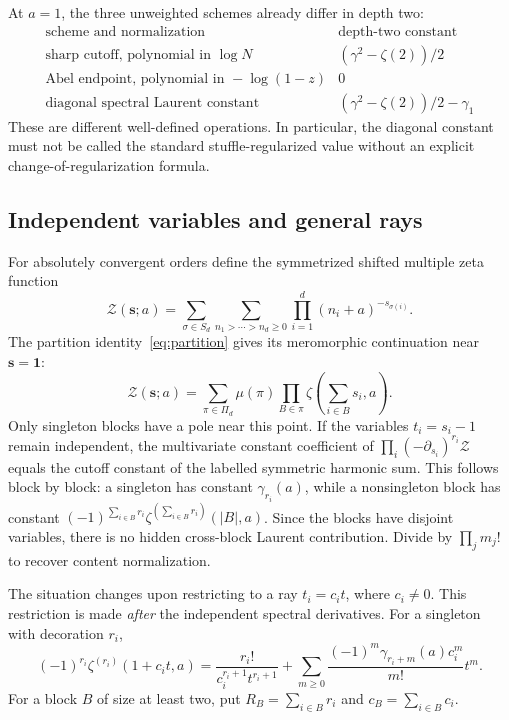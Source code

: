 \documentclass[11pt,oneside]{article}
\numberwithin{equation}{section}
\theoremstyle{definition}
\theoremstyle{remark}
\begin{document}
At $a=1$, the three unweighted schemes already differ in depth two:
\begin{equation}\label{eq:three-schemes}
\begin{array}{c|c}
\text{scheme and normalization}&\text{depth-two constant}\\ \hline
\text{sharp cutoff, polynomial in }\log N
  &(\gamma^2-\zeta(2))/2\\[2pt]
\text{Abel endpoint, polynomial in }-\log(1-z)&0\\[2pt]
\text{diagonal spectral Laurent constant}
  &(\gamma^2-\zeta(2))/2-\gamma_1
\end{array}
\end{equation}
These are different well-defined operations. In particular, the diagonal
constant must not be called the standard stuffle-regularized value without
an explicit change-of-regularization formula.

\subsection{Independent variables and general rays}

For absolutely convergent orders define the symmetrized shifted multiple
zeta function
\[
\mathscr Z(\mathbf s;a)=\sum_{\sigma\in S_d}
 \sum_{n_1>\cdots>n_d\ge0}
 \prod_{i=1}^d(n_i+a)^{-s_{\sigma(i)}}.
\]
The partition identity~\eqref{eq:partition} gives its meromorphic continuation
near $\mathbf s=\mathbf1$:
\begin{equation}\label{eq:symmetric-zeta}
\mathscr Z(\mathbf s;a)=\sum_{\pi\in\Pi_d}\mu(\pi)
                         \prod_{B\in\pi}\zeta\!\left(\sum_{i\in B}s_i,a\right).
\end{equation}
Only singleton blocks have a pole near this point. If the variables
$t_i=s_i-1$ remain independent, the multivariate constant coefficient of
$\prod_i(-\partial_{s_i})^{r_i}\mathscr Z$ equals the cutoff constant of the
labelled symmetric harmonic sum. This follows block by block: a singleton
has constant $\gamma_{r_i}(a)$, while a nonsingleton block has constant
$(-1)^{\sum_{i\in B}r_i}\zeta^{(\sum_{i\in B}r_i)}(|B|,a)$.
Since the blocks have disjoint variables, there is no hidden cross-block
Laurent contribution. Divide by $\prod_jm_j!$ to recover content normalization.

The situation changes upon restricting to a ray $t_i=c_it$, where $c_i\ne0$.
This restriction is made \emph{after} the independent spectral derivatives.
For a singleton with decoration $r_i$,
\begin{equation}\label{eq:singleton-ray}
(-1)^{r_i}\zeta^{(r_i)}(1+c_it,a)
=\frac{r_i!}{c_i^{r_i+1}t^{r_i+1}}
 +\sum_{m\ge0}\frac{(-1)^m\gamma_{r_i+m}(a)c_i^m}{m!}t^m.
\end{equation}
For a block $B$ of size at least two, put
$R_B=\sum_{i\in B}r_i$ and $c_B=\sum_{i\in B}c_i$.
\end{document}
